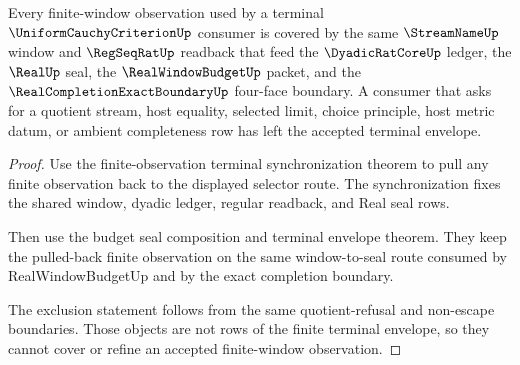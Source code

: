 \begin{theorem}
\label{thm:uniform-cauchy-criterion-finite-window-coverage}
Every finite-window observation used by a terminal $\UniformCauchyCriterionUp$ consumer is covered by the same $\StreamNameUp$ window and $\RegSeqRatUp$ readback that feed the $\DyadicRatCoreUp$ ledger, the $\RealUp$ seal, the $\RealWindowBudgetUp$ packet, and the $\RealCompletionExactBoundaryUp$ four-face boundary. A consumer that asks for a quotient stream, host equality, selected limit, choice principle, host metric datum, or ambient completeness row has left the accepted terminal envelope.
\end{theorem}
\begin{proof}
Use the finite-observation terminal synchronization theorem to pull any finite observation back to the displayed selector route. The synchronization fixes the shared window, dyadic ledger, regular readback, and Real seal rows.

Then use the budget seal composition and terminal envelope theorem. They keep the pulled-back finite observation on the same window-to-seal route consumed by RealWindowBudgetUp and by the exact completion boundary.

The exclusion statement follows from the same quotient-refusal and non-escape boundaries. Those objects are not rows of the finite terminal envelope, so they cannot cover or refine an accepted finite-window observation.
\end{proof}

